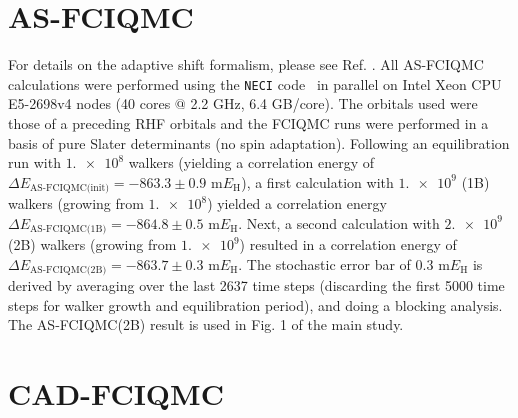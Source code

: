 \documentclass[journal=jcp,manuscript=suppinfo]{achemso}
\begin{document}
\section{AS-FCIQMC}\label{as_fciqmc_SI_sect}

For details on the adaptive shift formalism, please see Ref. . All AS-FCIQMC calculations were performed using the {\texttt{NECI}} code~\cite{neci} in parallel on Intel Xeon CPU E5-2698v4 nodes (40 cores $@$ 2.2 GHz, 6.4 GB/core). The orbitals used were those of a preceding RHF orbitals and the FCIQMC runs were performed in a basis of pure Slater determinants (no spin adaptation). Following an equilibration run with $\num{1.e8}$ walkers (yielding a correlation energy of $\Delta E_{\text{AS-FCIQMC(init)}} = -863.3\pm0.9$ m$E_{\text{H}}$), a first calculation with $\num{1.e9}$ (1B) walkers (growing from $\num{1.e8}$) yielded a correlation energy $\Delta E_{\text{AS-FCIQMC(1B)}} = -864.8\pm0.5$ m$E_{\text{H}}$. Next, a second calculation with $\num{2.e9}$ (2B) walkers (growing from $\num{1.e9}$) resulted in a correlation energy of $\Delta E_{\text{AS-FCIQMC(2B)}} = -863.7\pm0.3$ m$E_{\text{H}}$. The stochastic error bar of $0.3$ m$E_{\text{H}}$ is derived by averaging over the last 2637 time steps (discarding the first 5000 time steps for walker growth and equilibration period), and doing a blocking analysis. The AS‐FCIQMC(2B) result is used in Fig. 1 of the main study.

\section{CAD-FCIQMC}
\end{document}
